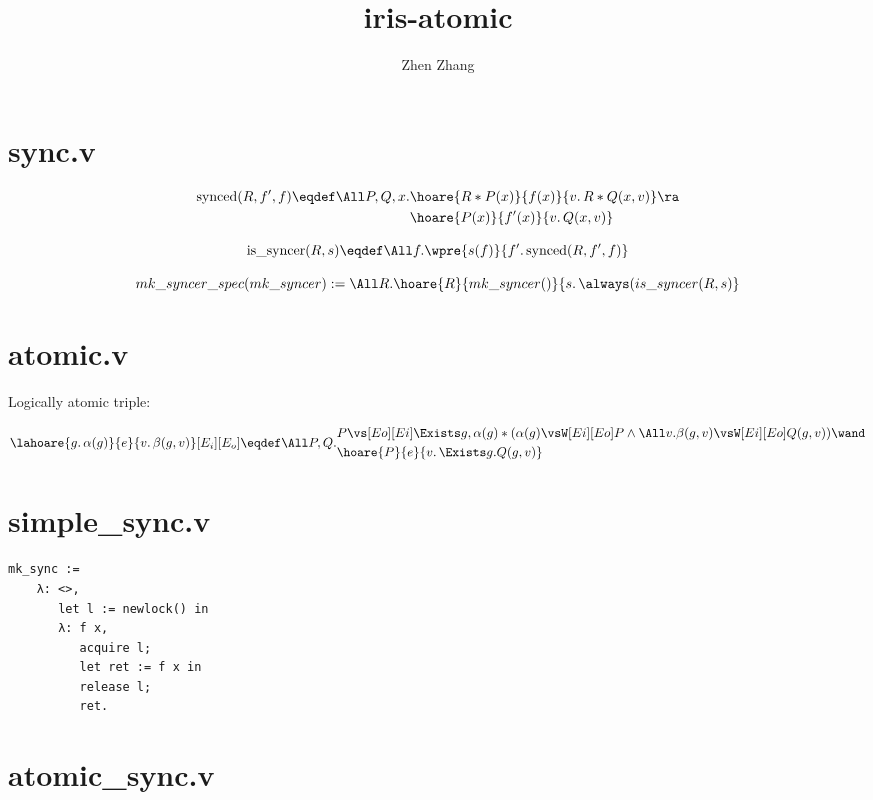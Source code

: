 \documentclass[10pt]{article}
\begin{document}
\title{\bfseries iris-atomic}
\author{Zhen Zhang}
\maketitle

\section{sync.v}


\[\begin{aligned}
    \text{synced}(R, f', f) \eqdef
    \All P, Q, x.
      &\hoare{ R * P(x)}{f(x)}{ v.\,R * Q(x,v) } \ra \\
      &\hoare{ P(x)}{f'(x)}{ v.\,Q(x,v) }
  \end{aligned}\]

\[
  \text{is\_syncer}(R, s) \eqdef
    \All f. \wpre{s(f)}{ f'.\, \text{synced}(R, f', f)} \]


\[
  mk\_syncer\_spec (mk\_syncer) :=
    \All R.
        \hoare{R}{mk\_syncer()}{ s.\,\always (is\_syncer(R, s)} \]


\section{atomic.v}

Logically atomic triple:

\[  
    \lahoare{g.\, \alpha(g)}{e}{v.\, \beta(g, v)}[E_i][E_o] \eqdef
    \All P, Q.
    \begin{aligned}
          &P \vs[Eo][Ei] \Exists g, \alpha(g) * (\alpha(g) \vsW[Ei][Eo] P \land \All v. \beta(g, v) \vsW[Ei][Eo] Q(g, v)) \wand \\
          &\hoare{P}{e}{v.\, \Exists g. Q(g, v)}
    \end{aligned}\]

\section{simple\_sync.v}

\begin{verbatim}
mk_sync :=
    λ: <>,
       let l := newlock() in
       λ: f x,
          acquire l;
          let ret := f x in
          release l;
          ret.
\end{verbatim}

\section{atomic\_sync.v}
\end{document}
